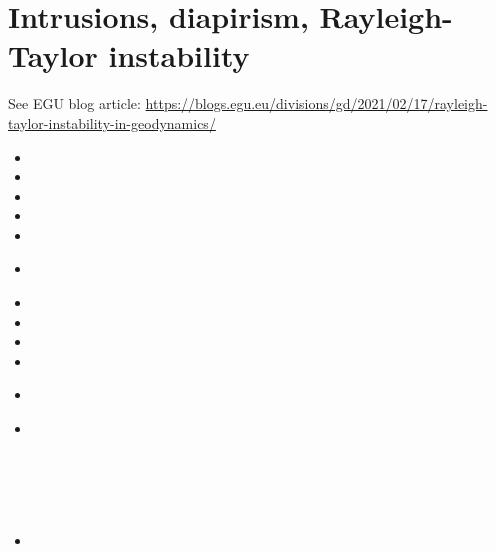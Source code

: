 \section{Intrusions, diapirism, Rayleigh-Taylor instability}

See EGU blog article: 
\url{https://blogs.egu.eu/divisions/gd/2021/02/17/rayleigh-taylor-instability-in-geodynamics/}

\begin{scriptsize}
\begin{itemize}
\item[\nineteensixtyfive] 
\item[\nineteensixtyeight] 
\item[\nineteenseventytwo] 
\item[\nineteenseventyfive] 
\item[\nineteenseventyeight] 
\item[\nineteeneighty] 
 \\
\item[\nineteeneightyone] 
\item[\nineteeneightythree] 
\item[\nineteeneightysix] 
\item[\nineteeneightyseven] 
\item[\nineteeneightyeight] 
 \\
\item[\nineteenninetytwo] 
 \\
 \\
 \\
 \\
 \\
\item[\nineteenninetythree] 
 \\
 \\
 \\
 \\
 \\
 \\

\end{itemize}
\end{scriptsize}
